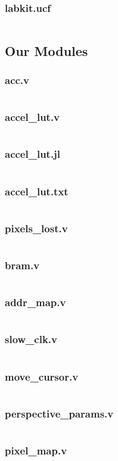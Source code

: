 \documentclass{article}
\begin{document}
\subsubsection{labkit.ucf}
\inputminted[linenos]{verilog}{../../src/labkit.ucf}

\subsection{Our Modules}
\subsubsection{acc.v}
\inputminted[linenos]{verilog}{../../src/acc.v}
\subsubsection{accel\_lut.v}
\inputminted[linenos]{verilog}{../../src/accel_lut.v}
\subsubsection{accel\_lut.jl}
\inputminted[linenos]{julia}{../../src/accel_lut.jl}
\subsubsection{accel\_lut.txt}
\inputminted[linenos]{todotxt}{../../src/accel_lut.txt}
\subsubsection{pixels\_lost.v}
\inputminted[linenos]{verilog}{../../src/pixels_lost.v}
\subsubsection{bram.v}
\inputminted[linenos]{verilog}{../../src/bram.v}
\subsubsection{addr\_map.v}
\inputminted[linenos]{verilog}{../../src/addr_map.v}
\subsubsection{slow\_clk.v}
\inputminted[linenos]{verilog}{../../src/slow_clk.v}
\subsubsection{move\_cursor.v}
\inputminted[linenos]{verilog}{../../src/move_cursor.v}
\subsubsection{perspective\_params.v}
\inputminted[linenos]{verilog}{../../src/perspective_params.v}
\subsubsection{pixel\_map.v}
\inputminted[linenos]{verilog}{../../src/pixel_map.v}
\end{document}
